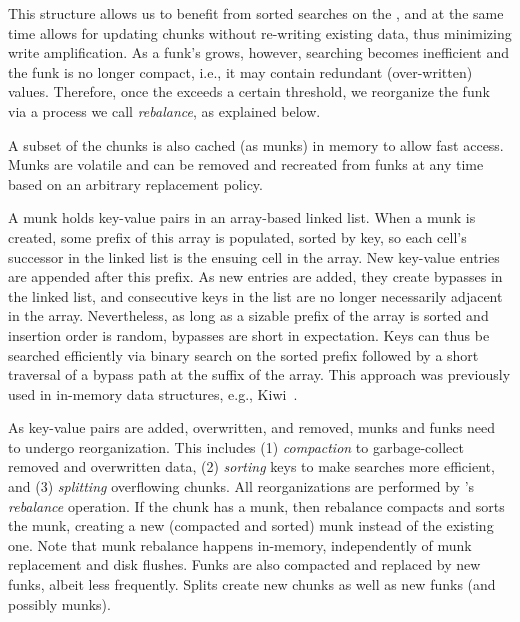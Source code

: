 This structure allows us to benefit from sorted searches on the , and at the same time
allows for updating chunks without re-writing existing data, thus minimizing write amplification.
As a funk's   grows, however, searching becomes inefficient   and  
the funk is no longer compact, i.e., it may contain redundant (over-written) values.
Therefore, once the   exceeds a certain threshold, we reorganize the funk
via a process we call \emph{rebalance}, as explained below.

A subset of the chunks is also cached (as munks) in memory to allow fast access.
Munks are volatile and can be removed and recreated from funks at any time based on an arbitrary replacement policy.


A munk holds key-value pairs in an array-based linked list.  
When a munk is created, some prefix of this array is populated,
sorted by key, so each cell's successor in the linked list is the ensuing cell in the array.
New key-value entries are appended after this prefix.
As new entries are added, they create bypasses in the linked list, and consecutive keys in the
list are no longer necessarily adjacent in the array. Nevertheless, as long as 
a sizable prefix of the  array  is sorted and insertion order is random, bypasses are short in expectation.
Keys can thus be searched efficiently via binary search on the sorted prefix followed by a short traversal 
of a bypass path at the suffix of the array. This approach was previously used in in-memory data structures,
e.g., Kiwi~\cite{kiwi}.  

As key-value pairs are added, overwritten, and removed, munks and funks need to undergo reorganization. This includes  
(1) \emph{compaction} to garbage-collect removed and overwritten data, 
(2) \emph{sorting} keys to make searches more efficient,  and
(3) \emph{splitting} overflowing chunks.
All reorganizations are performed by \sys's \emph{rebalance} operation.
If the chunk has a munk, then rebalance compacts and sorts the munk, creating a new 
(compacted and sorted) munk instead of the existing one. 
Note that munk rebalance happens in-memory, independently of munk replacement and disk flushes. 
Funks are also compacted and replaced by new funks, albeit less frequently.
Splits  create new chunks as well as new  funks (and possibly munks).

